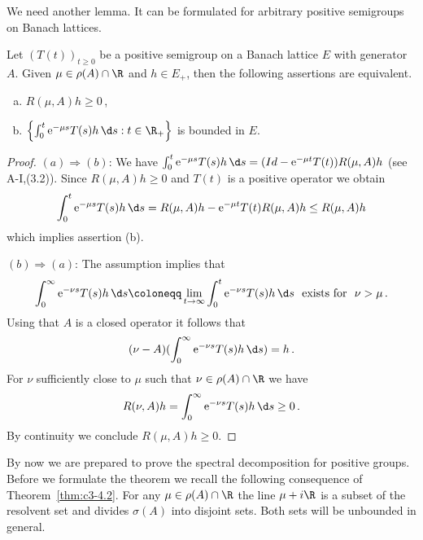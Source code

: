 We need another lemma. It can be formulated for arbitrary positive
semigroups on Banach lattices.

\begin{lemma}\label{lem:c3-4.7}
Let $(T(t))_{t \geq 0}$ be a positive semigroup on a Banach
lattice $E$ with generator $A$. Given $\mu \in \rho(A) \cap \R $ and $h \in E_+$, then the following assertions are equivalent.
\begin{enumerate}[(a)]
	\item 
	$R(\mu,A)h \geq 0$\,,

	\item 
	$\left\{\int_{0}^{t} \mathrm{e}^{-\mu s}T(s)h \, \d s : t \in \R _+\right\}$ is bounded in $E$.
\end{enumerate}
\end{lemma}

\begin{proof}
$(a)\Rightarrow(b)$: We have
$\int_{0}^{t} \mathrm{e}^{-\mu s}T(s)h \, \d s = (Id - \mathrm{e}^{-\mu t}T(t))R(\mu,A)h$ (see A-I,(3.2)).
Since $R(\mu,A)h \geq 0$ and $T(t)$ is a positive operator we obtain
\[
\int_{0}^{t} \mathrm{e}^{-\mu s}T(s)h \, \d s = R(\mu,A)h - \mathrm{e}^{-\mu t}T(t)R(\mu,A)h \leq R(\mu,A)h
\] 
which implies assertion (b).

$(b)\Rightarrow(a)$: The assumption implies that 
\[
\int_{0}^{\infty} \mathrm{e}^{-\nu s}T(s)h \, \d s \coloneqq 
\lim_{t \to \infty} \int_{0}^{t} \mathrm{e}^{-\nu s}T(s)h \, \d s \ \text{ exists for } \ \nu > \mu\,. 
\]
Using that $A$ is a closed operator it follows that 
\[
(\nu - A)(\int_{0}^{\infty} \mathrm{e}^{-\nu s}T(s)h \, \d s) = h\,.
\]
For $\nu$
sufficiently close to $\mu$ such that $\nu \in \rho(A) \cap \R $ we have 
\[ 
R(\nu,A)h = \int_{0}^{\infty} \mathrm{e}^{-\nu s}T(s)h \, \d s \geq 0\,. 
\] 
By continuity we conclude $R(\mu,A)h \geq 0$.
\end{proof}

By now we are prepared to prove the spectral decomposition for positive groups. Before we formulate the theorem we recall the following
consequence of Theorem~\ref{thm:c3-4.2}. For any $\mu \in \rho(A) \cap \R $ the line $\mu+i\R $ is a
subset of the resolvent set and divides $\sigma(A)$ into disjoint sets.
Both sets will be unbounded in general.

